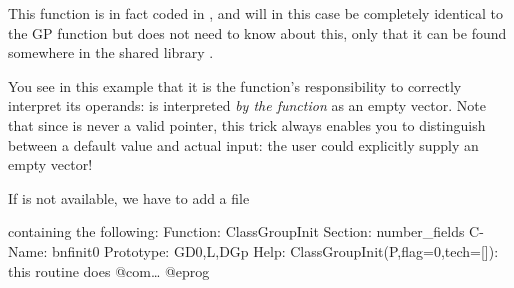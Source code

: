 This function is in fact coded in , and will in this
case be completely identical to the GP function  but  does
not need to know about this, only that it can be found somewhere in the
shared library .

 You see in this example that it is the
function's responsibility to correctly interpret its operands:  is interpreted \emph{by the function} as an empty vector. Note that
since  is never a valid  pointer, this trick always
enables you to distinguish between a default value and actual input: the
user could explicitly supply an empty vector!

 If  is not available, we have to add a file


\noindent containing the following:
\bprog
Function: ClassGroupInit
Section: number_fields
C-Name: bnfinit0
Prototype: GD0,L,DGp
Help: ClassGroupInit(P,{flag=0},{tech=[]}): this routine does @com\dots
@eprog
\vfill\eject
